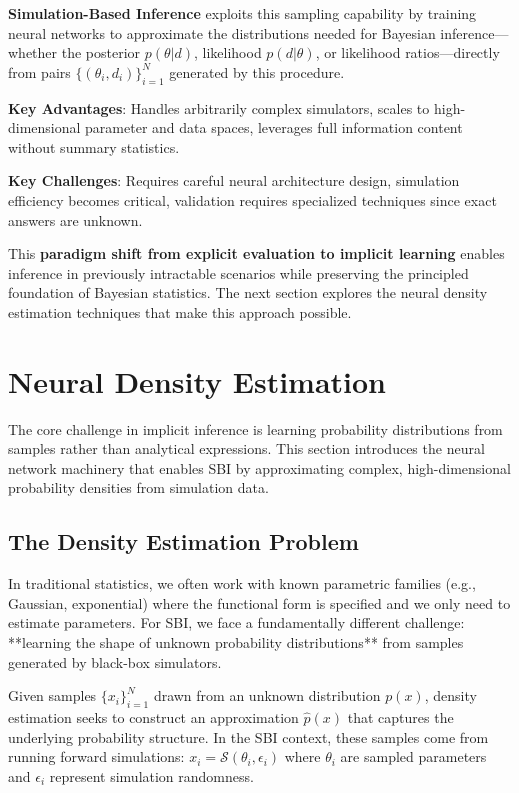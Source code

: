 \documentclass[11pt,a4paper]{article}
\theoremstyle{definition}
\begin{document}
\textbf{Simulation-Based Inference} exploits this sampling capability by training neural networks to approximate the distributions needed for Bayesian inference—whether the posterior $p(\theta|d)$, likelihood $p(d|\theta)$, or likelihood ratios—directly from pairs $\{(\theta_i, d_i)\}_{i=1}^N$ generated by this procedure.

\textbf{Key Advantages}: Handles arbitrarily complex simulators, scales to high-dimensional parameter and data spaces, leverages full information content without summary statistics.

\textbf{Key Challenges}: Requires careful neural architecture design, simulation efficiency becomes critical, validation requires specialized techniques since exact answers are unknown.

This \textbf{paradigm shift from explicit evaluation to implicit learning} enables inference in previously intractable scenarios while preserving the principled foundation of Bayesian statistics. The next section explores the neural density estimation techniques that make this approach possible.

\section{Neural Density Estimation}

The core challenge in implicit inference is learning probability distributions from samples rather than analytical expressions. This section introduces the neural network machinery that enables SBI by approximating complex, high-dimensional probability densities from simulation data.

\subsection{The Density Estimation Problem}

In traditional statistics, we often work with known parametric families (e.g., Gaussian, exponential) where the functional form is specified and we only need to estimate parameters. For SBI, we face a fundamentally different challenge: **learning the shape of unknown probability distributions** from samples generated by black-box simulators.

Given samples $\{x_i\}_{i=1}^N$ drawn from an unknown distribution $p(x)$, density estimation seeks to construct an approximation $\hat{p}(x)$ that captures the underlying probability structure. In the SBI context, these samples come from running forward simulations: $x_i = \mathcal{S}(\theta_i, \epsilon_i)$ where $\theta_i$ are sampled parameters and $\epsilon_i$ represent simulation randomness.
\end{document}
